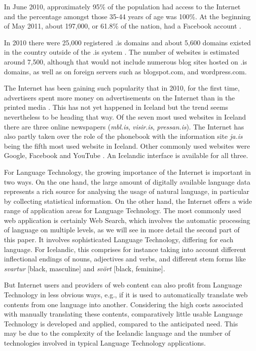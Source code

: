 \begin{multicols}{2}
In June 2010, approximately 95\% of the population had access to the Internet \cite{sta1} and the percentage amongst those 35-44 years of age was 100\%. At the beginning of May 2011, about 197,000, or 61.8\% of the nation, had a Facebook account \cite{fac1}.  

In 2010 there were 25,000 registered .is domains \cite{len1} and about 5,600 domains existed in the country outside of the .is system \cite{len2}. The number of websites is estimated around 7,500, although that would not include numerous blog sites hosted on .is domains, as well as on foreign servers such as blogspot.com, and wordpress.com. 

The Internet has been gaining such popularity that in 2010, for the first time, advertisers spent more money on advertisements on the Internet than in the printed media \cite{abs1}. This has not yet happened in Iceland but the trend seems nevertheless to be heading that way. Of the seven most used websites in Iceland there are three online newspapers (\textit{mbl.is}, \textit{visir.is}, \textit{pressan.is}). The Internet has also partly taken over the role of the phonebook with the information site \textit{ja.is} being the fifth most used website in Iceland. Other commonly used websites were Google, Facebook and YouTube \cite{abs2}. An Icelandic interface is available for all three.


For Language Technology, the growing importance of the Internet is important in two ways. On the one hand, the large amount of digitally available language data represents a rich source for analysing the usage of natural language, in particular by collecting statistical information. On the other hand, the Internet offers a wide range of application areas for Language Technology. 
The most commonly used web application is certainly Web Search, which involves the automatic processing of language on multiple levels, as we will see in more detail the second part of this paper. It involves sophisticated Language Technology, differing for each language. For Icelandic, this comprises for instance taking into account different inflectional endings of nouns, adjectives and verbs, and different stem forms like \textit{svart\-ur} {[}black, masculine{]} and \textit{svört} {[}black, feminine{]}. 


But Internet users and providers of web content can also profit from Language Technology in less obvious ways, e.g., if it is used to automatically translate web contents from one language into another. Considering the high costs associated with manually translating these contents, comparatively little usable Language Technology is developed and applied, compared to the anticipated need. This may be due to the complexity of the Icelandic language and the number of technologies involved in typical Language Technology applications. 


\end{multicols}
